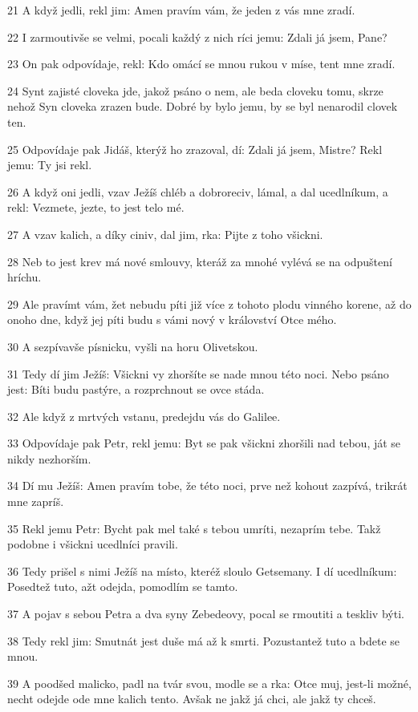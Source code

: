 \par 21 A když jedli, rekl jim: Amen pravím vám, že jeden z vás mne zradí.
\par 22 I zarmoutivše se velmi, pocali každý z nich ríci jemu: Zdali já jsem, Pane?
\par 23 On pak odpovídaje, rekl: Kdo omácí se mnou rukou v míse, tent mne zradí.
\par 24 Synt zajisté cloveka jde, jakož psáno o nem, ale beda cloveku tomu, skrze nehož Syn cloveka zrazen bude. Dobré by bylo jemu, by se byl nenarodil clovek ten.
\par 25 Odpovídaje pak Jidáš, kterýž ho zrazoval, dí: Zdali já jsem, Mistre? Rekl jemu: Ty jsi rekl.
\par 26 A když oni jedli, vzav Ježíš chléb a dobroreciv, lámal, a dal ucedlníkum, a rekl: Vezmete, jezte, to jest telo mé.
\par 27 A vzav kalich, a díky ciniv, dal jim, rka: Pijte z toho všickni.
\par 28 Neb to jest krev má nové smlouvy, kteráž za mnohé vylévá se na odpuštení hríchu.
\par 29 Ale pravímt vám, žet nebudu píti již více z tohoto plodu vinného korene, až do onoho dne, když jej píti budu s vámi nový v království Otce mého.
\par 30 A sezpívavše písnicku, vyšli na horu Olivetskou.
\par 31 Tedy dí jim Ježíš: Všickni vy zhoršíte se nade mnou této noci. Nebo psáno jest: Bíti budu pastýre, a rozprchnout se ovce stáda.
\par 32 Ale když z mrtvých vstanu, predejdu vás do Galilee.
\par 33 Odpovídaje pak Petr, rekl jemu: Byt se pak všickni zhoršili nad tebou, ját se nikdy nezhorším.
\par 34 Dí mu Ježíš: Amen pravím tobe, že této noci, prve než kohout zazpívá, trikrát mne zapríš.
\par 35 Rekl jemu Petr: Bycht pak mel také s tebou umríti, nezaprím tebe. Takž podobne i všickni ucedlníci pravili.
\par 36 Tedy prišel s nimi Ježíš na místo, kteréž sloulo Getsemany. I dí ucedlníkum: Posedtež tuto, ažt odejda, pomodlím se tamto.
\par 37 A pojav s sebou Petra a dva syny Zebedeovy, pocal se rmoutiti a teskliv býti.
\par 38 Tedy rekl jim: Smutnát jest duše má až k smrti. Pozustantež tuto a bdete se mnou.
\par 39 A poodšed malicko, padl na tvár svou, modle se a rka: Otce muj, jest-li možné, necht odejde ode mne kalich tento. Avšak ne jakž já chci, ale jakž ty chceš.
